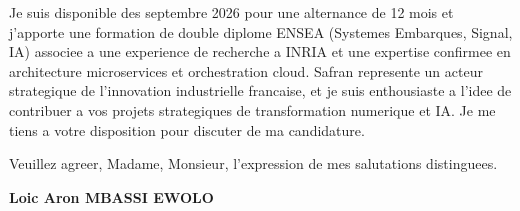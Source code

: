 \documentclass[a4paper,11pt]{article}
\begin{document}
Je suis disponible des septembre 2026 pour une alternance de 12 mois et j'apporte une formation de double diplome ENSEA (Systemes Embarques, Signal, IA) associee a une experience de recherche a INRIA et une expertise confirmee en architecture microservices et orchestration cloud. Safran represente un acteur strategique de l'innovation industrielle francaise, et je suis enthousiaste a l'idee de contribuer a vos projets strategiques de transformation numerique et IA. Je me tiens a votre disposition pour discuter de ma candidature.

\vspace{1.5em}
\noindent Veuillez agreer, Madame, Monsieur, l'expression de mes salutations distinguees.

\vspace{2em}
\noindent \textbf{Loic Aron MBASSI EWOLO}
\end{document}

